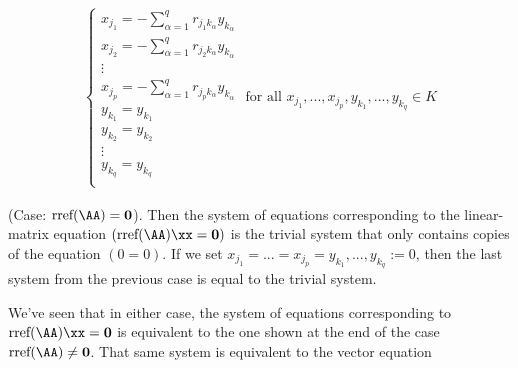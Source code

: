\begin{deriv}
    \begin{align*}
        \begin{cases}
            x_{j_1} = -\sum_{\alpha = 1}^q r_{j_1 k_\alpha} y_{k_\alpha} \\
            x_{j_2} = -\sum_{\alpha = 1}^q r_{j_2 k_\alpha} y_{k_\alpha} \\
            \vdots \\
            x_{j_p} = -\sum_{\alpha = 1}^q r_{j_p k_\alpha} y_{k_\alpha}  \\
            y_{k_1} = y_{k_1} \\
            y_{k_2} = y_{k_2} \\
            \vdots \\
            y_{k_q} = y_{k_q} \\
        \end{cases}
        \text{ for all $x_{j_1}, ..., x_{j_p}, y_{k_1}, ..., y_{k_q} \in K$}
    \end{align*}

    (Case: $\rref(\AA) = \mathbf{0}$). Then the system of equations corresponding to the linear-matrix equation $(\rref(\AA) \xx = \mathbf{0})$ is the trivial system that only contains copies of the equation $(0 = 0)$. If we set $x_{j_1} = ... = x_{j_p} = y_{k_1}, ..., y_{k_q} := 0$, then the last system from the previous case is equal to the trivial system.

    \vspace{.25cm}

    We've seen that in either case, the system of equations corresponding to $\rref(\AA) \xx = \mathbf{0}$ is equivalent to the one shown at the end of the case $\rref(\AA) \neq \mathbf{0}$. That same system is equivalent to the vector equation


\end{deriv}

